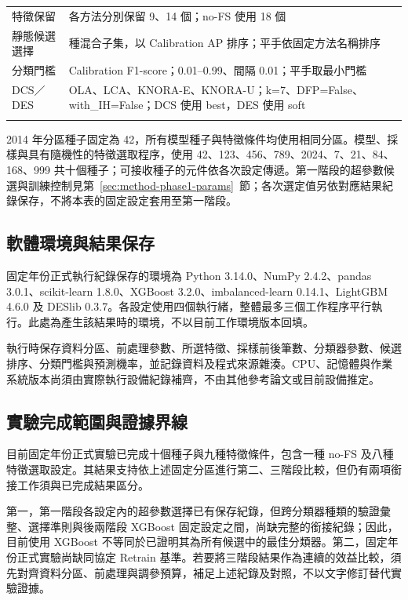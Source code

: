 \begin{longtable}{@{}>{\raggedright\arraybackslash}p{}>{\raggedright\arraybackslash}p{}@{}}
\addlinespace[2pt]
特徵保留 & 各方法分別保留 9、14 個；no-FS 使用 18 個 \\
\addlinespace[2pt]
靜態候選選擇 & 49 種混合子集，以 Calibration AP 排序；平手依固定方法名稱排序 \\
\addlinespace[2pt]
分類門檻 & Calibration F1-score；0.01–0.99、間隔 0.01；平手取最小門檻 \\
\addlinespace[2pt]
DCS／DES & OLA、LCA、KNORA-E、KNORA-U；{\normalfont k=\allowbreak{}7}、{\normalfont DFP=\allowbreak{}False}、{\normalfont with\_\allowbreak{}IH=\allowbreak{}False}；DCS 使用 {\normalfont best}，DES 使用 {\normalfont soft} \\*
\end{longtable}
\endgroup

2014 年分區種子固定為 42，所有模型種子與特徵條件均使用相同分區。模型、採樣與具有隨機性的特徵選取程序，使用 42、123、456、789、2024、7、21、84、168、999 共十個種子；可接收種子的元件依各次設定傳遞。第一階段的超參數候選與訓練控制見第~\ref{sec:method-phase1-params}~節；各次選定值另依對應結果紀錄保存，不將本表的固定設定套用至第一階段。

\subsection{軟體環境與結果保存}

固定年份正式執行紀錄保存的環境為 Python 3.14.0、NumPy 2.4.2、pandas 3.0.1、scikit-learn 1.8.0、XGBoost 3.2.0、imbalanced-learn 0.14.1、LightGBM 4.6.0 及 DESlib 0.3.7。各設定使用四個執行緒，整體最多三個工作程序平行執行。此處為產生該結果時的環境，不以目前工作環境版本回填。

執行時保存資料分區、前處理參數、所選特徵、採樣前後筆數、分類器參數、候選排序、分類門檻與預測機率，並記錄資料及程式來源雜湊。CPU、記憶體與作業系統版本尚須由實際執行設備紀錄補齊，不由其他參考論文或目前設備推定。

\subsection{實驗完成範圍與證據界線}\label{sec:method-evidence}

目前固定年份正式實驗已完成十個種子與九種特徵條件，包含一種 no-FS 及八種特徵選取設定。其結果支持依上述固定分區進行第二、三階段比較，但仍有兩項銜接工作須與已完成結果區分。

第一，第一階段各設定內的超參數選擇已有保存紀錄，但跨分類器種類的驗證彙整、選擇準則與後兩階段 XGBoost 固定設定之間，尚缺完整的銜接紀錄；因此，目前使用 XGBoost 不等同於已證明其為所有候選中的最佳分類器。第二，固定年份正式實驗尚缺同協定 Retrain 基準。若要將三階段結果作為連續的效益比較，須先對齊資料分區、前處理與調參預算，補足上述紀錄及對照，不以文字修訂替代實驗證據。

